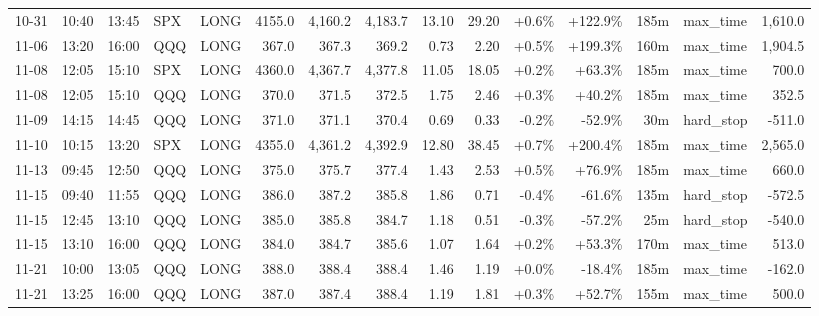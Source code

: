 \documentclass[11pt,a4paper,twoside]{article}
\begin{document}
\begin{landscape}
\begin{center}
\begin{longtable}{>{\color{txtmain}}l l l l l r r r r r r r r >{\color{txtmain}}l r}
10-31 & 10:40 & 13:45 & SPX & LONG & 4155.0 & 4,160.2 & 4,183.7 & 13.10 & 29.20 & \textcolor{wingreen}{+0.6\%} & \textcolor{wingreen}{+122.9\%} & 185m & max\_time & \textcolor{wingreen}{1,610.0} \\
11-06 & 13:20 & 16:00 & QQQ & LONG & 367.0 & 367.3 & 369.2 & 0.73 & 2.20 & \textcolor{wingreen}{+0.5\%} & \textcolor{wingreen}{+199.3\%} & 160m & max\_time & \textcolor{wingreen}{1,904.5} \\
11-08 & 12:05 & 15:10 & SPX & LONG & 4360.0 & 4,367.7 & 4,377.8 & 11.05 & 18.05 & \textcolor{wingreen}{+0.2\%} & \textcolor{wingreen}{+63.3\%} & 185m & max\_time & \textcolor{wingreen}{700.0} \\
11-08 & 12:05 & 15:10 & QQQ & LONG & 370.0 & 371.5 & 372.5 & 1.75 & 2.46 & \textcolor{wingreen}{+0.3\%} & \textcolor{wingreen}{+40.2\%} & 185m & max\_time & \textcolor{wingreen}{352.5} \\
11-09 & 14:15 & 14:45 & QQQ & LONG & 371.0 & 371.1 & 370.4 & 0.69 & 0.33 & \textcolor{lossred}{-0.2\%} & \textcolor{lossred}{-52.9\%} & 30m & hard\_stop & \textcolor{lossred}{-511.0} \\
11-10 & 10:15 & 13:20 & SPX & LONG & 4355.0 & 4,361.2 & 4,392.9 & 12.80 & 38.45 & \textcolor{wingreen}{+0.7\%} & \textcolor{wingreen}{+200.4\%} & 185m & max\_time & \textcolor{wingreen}{2,565.0} \\
11-13 & 09:45 & 12:50 & QQQ & LONG & 375.0 & 375.7 & 377.4 & 1.43 & 2.53 & \textcolor{wingreen}{+0.5\%} & \textcolor{wingreen}{+76.9\%} & 185m & max\_time & \textcolor{wingreen}{660.0} \\
11-15 & 09:40 & 11:55 & QQQ & LONG & 386.0 & 387.2 & 385.8 & 1.86 & 0.71 & \textcolor{lossred}{-0.4\%} & \textcolor{lossred}{-61.6\%} & 135m & hard\_stop & \textcolor{lossred}{-572.5} \\
11-15 & 12:45 & 13:10 & QQQ & LONG & 385.0 & 385.8 & 384.7 & 1.18 & 0.51 & \textcolor{lossred}{-0.3\%} & \textcolor{lossred}{-57.2\%} & 25m & hard\_stop & \textcolor{lossred}{-540.0} \\
11-15 & 13:10 & 16:00 & QQQ & LONG & 384.0 & 384.7 & 385.6 & 1.07 & 1.64 & \textcolor{wingreen}{+0.2\%} & \textcolor{wingreen}{+53.3\%} & 170m & max\_time & \textcolor{wingreen}{513.0} \\
11-21 & 10:00 & 13:05 & QQQ & LONG & 388.0 & 388.4 & 388.4 & 1.46 & 1.19 & \textcolor{wingreen}{+0.0\%} & \textcolor{lossred}{-18.4\%} & 185m & max\_time & \textcolor{lossred}{-162.0} \\
11-21 & 13:25 & 16:00 & QQQ & LONG & 387.0 & 387.4 & 388.4 & 1.19 & 1.81 & \textcolor{wingreen}{+0.3\%} & \textcolor{wingreen}{+52.7\%} & 155m & max\_time & \textcolor{wingreen}{500.0} \\

\end{longtable}
\end{center}
\end{landscape}
\end{document}
